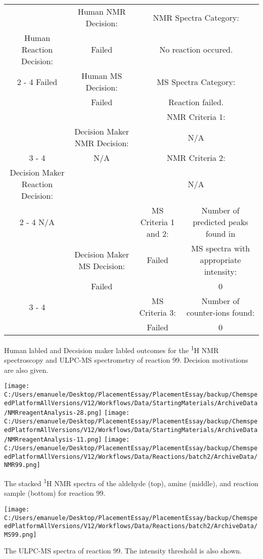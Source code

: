 \documentclass{article}%
\begin{document}
\begin{Decision Table}[H]%
\begin{tabular}{|c|c|c|c|}%
\hline%
&Human NMR Decision:&\multicolumn{2}{|c|}{NMR Spectra Category:}\\%
Human Reaction Decision:&Failed&\multicolumn{2}{|c|}{No reaction occured.}\\%
\cline{2%
-%
4}%
Failed&Human MS Decision:&\multicolumn{2}{|c|}{MS Spectra Category:}\\%
&Failed&\multicolumn{2}{|c|}{Reaction failed.}\\%
\hline%
&&\multicolumn{2}{|c|}{NMR Criteria 1:}\\%
&Decision Maker NMR Decision:&\multicolumn{2}{|c|}{N/A}\\%
\cline{3%
-%
4}%
&N/A&\multicolumn{2}{|c|}{NMR Criteria 2:}\\%
Decision Maker Reaction Decision:&&\multicolumn{2}{|c|}{N/A}\\%
\cline{2%
-%
4}%
N/A&&MS Criteria 1 and 2:&Number of predicted peaks found in\\%
&Decision Maker MS Decision:&Failed&MS spectra with appropriate intensity:\\%
&Failed&&0\\%
\cline{3%
-%
4}%
&&MS Criteria 3:&Number of counter{-}ions found:\\%
&&Failed&0\\%
\hline%
\end{tabular}%
\caption{Human labled and Decsision maker labled outcomes for the \textsuperscript{1}H NMR spectroscopy and ULPC-MS spectrometry of reaction 99. Decision motivations are also given.}%
\end{Decision Table}%
\begin{NMR Spectra}[H]%
\begin{center}%
\texttt{[image: C:/Users/emanuele/Desktop/PlacementEssay/PlacementEssay/backup/ChemspeedPlatformAllVersions/V12/Workflows/Data/StartingMaterials/ArchiveData/NMRreagentAnalysis-28.png]}\hfill%
\texttt{[image: C:/Users/emanuele/Desktop/PlacementEssay/PlacementEssay/backup/ChemspeedPlatformAllVersions/V12/Workflows/Data/StartingMaterials/ArchiveData/NMRreagentAnalysis-11.png]}\hfill%
\texttt{[image: C:/Users/emanuele/Desktop/PlacementEssay/PlacementEssay/backup/ChemspeedPlatformAllVersions/V12/Workflows/Data/Reactions/batch2/ArchiveData/NMR99.png]}\hfill%
\end{center}%
\caption{The stacked \textsuperscript{1}H NMR spectra of the aldehyde (top), amine (middle), and reaction sample (bottom) for reaction 99.}%
\end{NMR Spectra}%
\begin{MS Spectra}[H]%
\begin{center}%
\texttt{[image: C:/Users/emanuele/Desktop/PlacementEssay/PlacementEssay/backup/ChemspeedPlatformAllVersions/V12/Workflows/Data/Reactions/batch2/ArchiveData/MS99.png]}\hfill%
\end{center}%
\caption{The ULPC-MS spectra of reaction 99. The intensity threshold is also shown.}%
\end{MS Spectra}%
\end{document}

